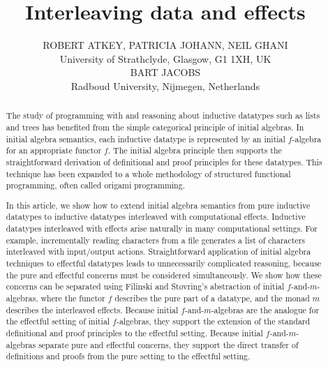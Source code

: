 \documentclass{jfp1}
\title{Interleaving data and effects}
\author[R. Atkey, P. Johann, N. Ghani, B. Jacobs]
       {ROBERT ATKEY, PATRICIA JOHANN, NEIL GHANI \\
         University of Strathclyde, Glasgow, G1 1XH, UK \\
         \vspace{0.3cm}
         BART JACOBS \\
         Radboud University, Nijmegen, Netherlands
         \email{$\{$robert.atkey,patricia.johann,neil.ghani$\}$@strath.ac.uk, bart@cs.ru.nl}}
\begin{document}
\label{firstpage}

\maketitle

\begin{abstract}
  The study of programming with and reasoning about inductive
  datatypes such as lists and trees has benefited from the simple
  categorical principle of initial algebras. In initial algebra
  semantics, each inductive datatype is represented by an initial
  $f$-algebra for an appropriate functor $f$. The initial algebra
  principle then supports the straightforward derivation of
  definitional and proof principles for these datatypes.  This
  technique has been expanded to a whole methodology of structured
  functional programming, often called origami programming.

  In this article, we show how to extend initial algebra semantics
  from pure inductive datatypes to inductive datatypes interleaved
  with computational effects. Inductive datatypes interleaved with
  effects arise naturally in many computational settings. For example,
  incrementally reading characters from a file generates a list of
  characters interleaved with input/output actions. Straightforward
  application of initial algebra techniques to effectful datatypes
  leads to unnecessarily complicated reasoning, because the pure and
  effectful concerns must be considered simultaneously. We show how
  these concerns can be separated using Filinski and St\o{}vring's
  abstraction of initial $f$-and-$m$-algebras, where the functor $f$
  describes the pure part of a datatype, and the monad $m$ describes
  the interleaved effects. Because initial $f$-and-$m$-algebras are
  the analogue for the effectful setting of initial $f$-algebras, they
  support the extension of the standard definitional and proof
  principles to the effectful setting. Because initial
  $f$-and-$m$-algebras separate pure and effectful concerns, they
  support the direct transfer of definitions and proofs from the pure
  setting to the effectful setting.




\end{abstract}
\end{document}
